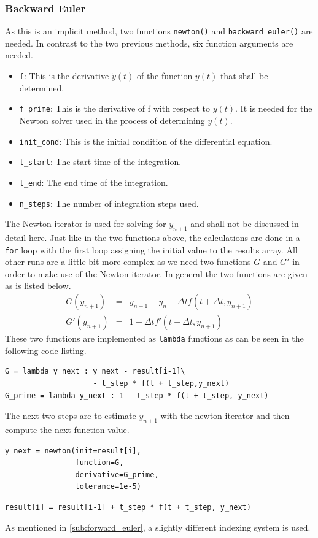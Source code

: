 \documentclass{aa}
\begin{document}
\subsubsection*{Backward Euler}%
\label{ssub:backward_euler}
As this is an implicit method, two functions \verb+newton()+ and \verb+backward_euler()+ are
needed. In contrast to the two previous methods, six function arguments are needed. 
\begin{itemize}
    \item \verb+f+: This is the derivative \(\dot{y}(t)\) of the function \(y(t)\) that shall
        be determined.
    \item \verb+f_prime+: This is the derivative of f with respect to \(y(t)\). It is needed
        for the Newton solver used in the process of determining \(y(t)\).
    \item \verb+init_cond+: This is the initial condition of the differential equation.
    \item \verb+t_start+: The start time of the integration.
    \item \verb+t_end+: The end time of the integration.
    \item \verb+n_steps+: The number of integration steps used.
\end{itemize}
The Newton iterator is used for solving for \(y_{n+1}\) and shall not be discussed in detail
here. Just like in the two functions above, the calculations are done in a \verb+for+ loop with
the first loop assigning the initial value to the results array. All other runs are a little
bit more complex as we need two functions \(G\) and \(G'\) in order to make use of the Newton
iterator. In general the two functions are given as is listed below.
\begin{eqnarray}
    \label{equ:g_funcs}
    G(y_{n+1}) & = & y_{n+1} - y_n - \Delta t f(t + \Delta t, y_{n+1}) \\ \label{equ:g_prime}
    G'(y_{n+1}) & = & 1 - \Delta t f'(t + \Delta t, y_{n+1})
\end{eqnarray}
These two functions are implemented as \verb+lambda+ functions as can be seen in the following
code listing.
\begin{lstlisting}[firstnumber=329, name=ode_solvers]
G = lambda y_next : y_next - result[i-1]\
                    - t_step * f(t + t_step,y_next)
G_prime = lambda y_next : 1 - t_step * f(t + t_step, y_next)
\end{lstlisting}
The next two steps are to estimate \(y_{n+1}\) with the newton iterator and then compute the
next function value.
\begin{lstlisting}[firstnumber=338, name=ode_solvers]
y_next = newton(init=result[i],
                function=G,
                derivative=G_prime,
                tolerance=1e-5)
\end{lstlisting}
\begin{lstlisting}[firstnumber=346, name=ode_solvers]
    result[i] = result[i-1] + t_step * f(t + t_step, y_next)
\end{lstlisting}
As mentioned in \ref{sub:forward_euler}, a slightly different indexing system is used.
\end{document}
